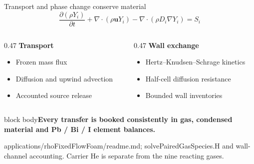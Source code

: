 \documentclass[aspectratio=169,10pt]{beamer}
\newcommand{\sources}[1]{\par\vfill{\raggedright\fontsize{6.2}{7.5}\selectfont\color{PSIgray}#1\par}}
\newcommand{\takeaway}[1]{\par\vspace{0.2em}\begin{beamercolorbox}[sep=0.4em,wd=\linewidth]{block body}{\small\textbf{#1}}\end{beamercolorbox}}
\begin{document}
\begin{frame}[t]{Transport and phase change conserve material}
  \[
    \frac{\partial(\rho Y_i)}{\partial t}
    +\nabla\!\cdot(\rho\mathbf{u}Y_i)
    -\nabla\!\cdot(\rho D_i\nabla Y_i)=S_i
  \]
  \begin{columns}[t,onlytextwidth]
    \begin{column}{0.47\textwidth}
      \textbf{Transport}\par
      \begin{itemize}
        \item Frozen mass flux
        \item Diffusion and upwind advection
        \item Accounted source release
      \end{itemize}
    \end{column}
    \begin{column}{0.47\textwidth}
      \textbf{Wall exchange}\par
      \begin{itemize}
        \item Hertz--Knudsen--Schrage kinetics
        \item Half-cell diffusion resistance
        \item Bounded wall inventories
      \end{itemize}
    \end{column}
  \end{columns}
  \takeaway{Every transfer is booked consistently in gas, condensed material and Pb / Bi / I element balances.}
  \sources{applications/rhoFixedFlowFoam/readme.md; solvePairedGasSpecies.H and wall-channel accounting. Carrier He is separate from the nine reacting gases.}
\end{frame}
\end{document}
